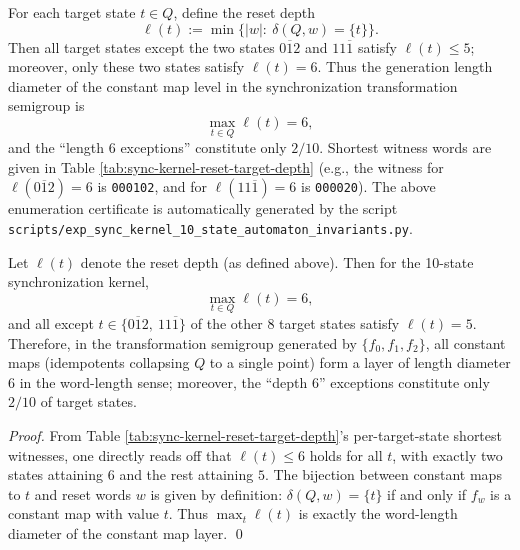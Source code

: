 \begin{proposition}\label{prop:sync10-reset-depth-spectrum}
For each target state \(t\in Q\), define the reset depth
\[
\ell(t):=\min\{|w|:\ \delta(Q,w)=\{t\}\}.
\]
Then all target states except the two states \(0\overline{1}2\) and \(11\overline{1}\) satisfy \(\ell(t)\le 5\); moreover, only these two states satisfy \(\ell(t)=6\).
Thus the generation length diameter of the constant map level in the synchronization transformation semigroup is
\[
\max_{t\in Q}\ell(t)=6,
\]
and the ``length \(6\) exceptions'' constitute only \(2/10\).
Shortest witness words are given in Table \ref{tab:sync-kernel-reset-target-depth} (e.g., the witness for \(\ell(0\overline{1}2)=6\) is \texttt{000102}, and for \(\ell(11\overline{1})=6\) is \texttt{000020}).
The above enumeration certificate is automatically generated by the script \texttt{scripts/exp\_sync\_kernel\_10\_state\_automaton\_invariants.py}.
\end{proposition}



\begin{proposition}\label{prop:sync10-reset-depth-diameter}
Let \(\ell(t)\) denote the reset depth (as defined above).
Then for the 10-state synchronization kernel,
\[
\max_{t\in Q}\ell(t)=6,
\]
and all except \(t\in\{0\overline{1}2,\ 11\overline{1}\}\) of the other \(8\) target states satisfy \(\ell(t)=5\).
Therefore, in the transformation semigroup generated by \(\{f_0,f_1,f_2\}\), all constant maps (idempotents collapsing \(Q\) to a single point) form a layer of length diameter \(6\) in the word-length sense; moreover, the ``depth \(6\)'' exceptions constitute only \(2/10\) of target states.
\end{proposition}
\begin{proof}
From Table \ref{tab:sync-kernel-reset-target-depth}'s per-target-state shortest witnesses, one directly reads off that \(\ell(t)\le 6\) holds for all \(t\), with exactly two states attaining \(6\) and the rest attaining \(5\).
The bijection between constant maps to \(t\) and reset words \(w\) is given by definition: \(\delta(Q,w)=\{t\}\) if and only if \(f_w\) is a constant map with value \(t\).
Thus \(\max_t\ell(t)\) is exactly the word-length diameter of the constant map layer. \qed
\end{proof}

